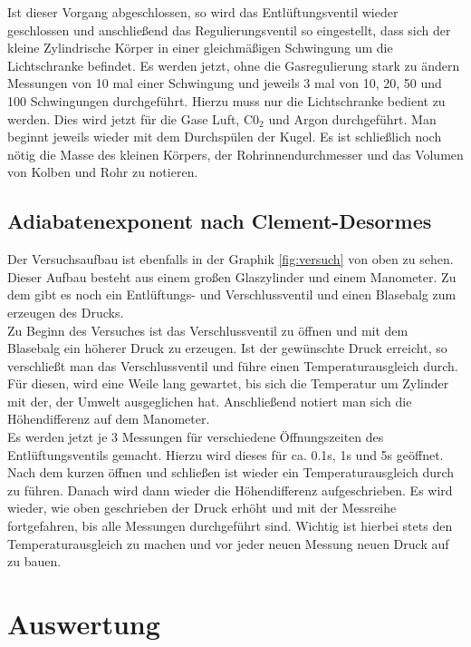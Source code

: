 \documentclass[12pt,a4paper,titlepage,headinclude,bibtotoc]{scrartcl}
\begin{document}
Ist dieser Vorgang abgeschlossen, so wird das Entlüftungsventil wieder geschlossen und anschließend das Regulierungsventil so eingestellt, dass sich der kleine Zylindrische Körper in einer gleichmäßigen Schwingung um die Lichtschranke befindet.
Es werden jetzt, ohne die Gasregulierung stark zu ändern Messungen von 10 mal einer Schwingung und jeweils 3 mal von 10, 20, 50 und 100 Schwingungen durchgeführt.
Hierzu muss nur die Lichtschranke bedient zu werden.
Dies wird jetzt für die Gase Luft, C0$_2$ und Argon durchgeführt.
Man beginnt jeweils wieder mit dem Durchspülen der Kugel.
Es ist schließlich noch nötig die Masse des kleinen Körpers, der Rohrinnendurchmesser und das Volumen von Kolben und Rohr zu notieren.

\subsection{Adiabatenexponent nach Clement-Desormes}
\label{sec:clem}
Der Versuchsaufbau ist ebenfalls in der Graphik \ref{fig:versuch} von oben zu sehen.
Dieser Aufbau besteht aus einem großen Glaszylinder und einem Manometer.
Zu dem gibt es noch ein Entlüftungs- und Verschlussventil und einen Blasebalg zum erzeugen des Drucks.\\
Zu Beginn des Versuches ist das Verschlussventil zu öffnen und mit dem Blasebalg ein höherer Druck zu erzeugen.
Ist der gewünschte Druck erreicht, so verschließt man das Verschlussventil und führe einen Temperaturausgleich durch.
Für diesen, wird eine Weile lang gewartet, bis sich die Temperatur um Zylinder mit der, der Umwelt ausgeglichen hat.
Anschließend notiert man sich die Höhendifferenz auf dem Manometer.\\
Es werden jetzt je 3 Messungen für verschiedene Öffnungszeiten des Entlüftungsventils gemacht.
Hierzu wird dieses für ca. 0.1s, 1s und 5s geöffnet.
Nach dem kurzen öffnen und schließen ist wieder ein Temperaturausgleich durch zu führen.
Danach wird dann wieder die Höhendifferenz aufgeschrieben.
Es wird wieder, wie oben geschrieben der Druck erhöht und mit der Messreihe fortgefahren, bis alle Messungen durchgeführt sind.
Wichtig ist hierbei stets den Temperaturausgleich zu machen und vor jeder neuen Messung neuen Druck auf zu bauen.

\section{Auswertung}
\label{sec:auswertung}
\end{document}
